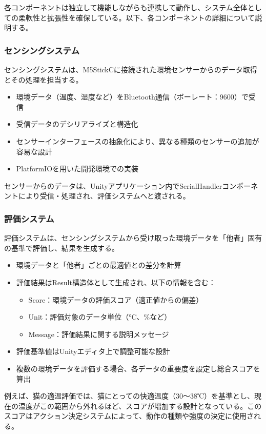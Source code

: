 \documentclass{cuxarticle}
\begin{document}
各コンポーネントは独立して機能しながらも連携して動作し、システム全体としての柔軟性と拡張性を確保している。以下、各コンポーネントの詳細について説明する。

\subsubsection{センシングシステム}
センシングシステムは、M5StickCに接続された環境センサーからのデータ取得とその処理を担当する。

\begin{itemize}
  \item 環境データ（温度、湿度など）をBluetooth通信（ボーレート：9600）で受信
  \item 受信データのデシリアライズと構造化
  \item センサーインターフェースの抽象化により、異なる種類のセンサーの追加が容易な設計
  \item PlatformIOを用いた開発環境での実装
\end{itemize}

センサーからのデータは、Unityアプリケーション内でSerialHandlerコンポーネントにより受信・処理され、評価システムへと渡される。

\subsubsection{評価システム}
評価システムは、センシングシステムから受け取った環境データを「他者」固有の基準で評価し、結果を生成する。

\begin{itemize}
  \item 環境データと「他者」ごとの最適値との差分を計算
  \item 評価結果はResult構造体として生成され、以下の情報を含む：
    \begin{itemize}
      \item Score：環境データの評価スコア（適正値からの偏差）
      \item Unit：評価対象のデータ単位（°C、\%など）
      \item Message：評価結果に関する説明メッセージ
    \end{itemize}
  \item 評価基準値はUnityエディタ上で調整可能な設計
  \item 複数の環境データを評価する場合、各データの重要度を設定し総合スコアを算出
\end{itemize}

例えば、猫の適温評価では、猫にとっての快適温度（30～38℃）を基準とし、現在の温度がこの範囲から外れるほど、スコアが増加する設計となっている。このスコアはアクション決定システムによって、動作の種類や強度の決定に使用される。
\end{document}
